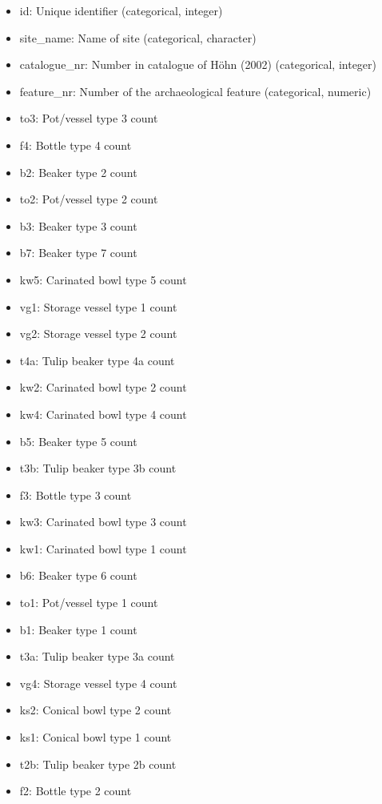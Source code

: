 \documentclass[a3, ruledsections, 8pt]{sciposter}
\begin{document}
\begin{multicols}{3}

\begin{small}

\begin{itemize}
\item id: Unique identifier (categorical, integer)
\item site\_name: Name of site (categorical, character)
\item catalogue\_nr: Number in catalogue of Höhn (2002) (categorical, integer)
\item feature\_nr: Number of the archaeological feature (categorical, numeric)
\item to3: Pot/vessel type 3 count
\item f4: Bottle type 4 count
\item b2: Beaker type 2 count
\item to2: Pot/vessel type 2 count
\item b3: Beaker type 3 count
\item b7: Beaker type 7 count
\item kw5: Carinated bowl type 5 count
\item vg1: Storage vessel type 1 count
\item vg2: Storage vessel type 2 count
\item t4a: Tulip beaker type 4a count
\item kw2: Carinated bowl type 2 count
\item kw4: Carinated bowl type 4 count
\item b5: Beaker type 5 count
\item t3b: Tulip beaker type 3b count
\item f3: Bottle type 3 count
\item kw3: Carinated bowl type 3 count
\item kw1: Carinated bowl type 1 count
\item b6: Beaker type 6 count
\item to1: Pot/vessel type 1 count
\item b1: Beaker type 1 count
\item t3a: Tulip beaker type 3a count
\item vg4: Storage vessel type 4 count
\item ks2: Conical bowl type 2 count
\item ks1: Conical bowl type 1 count
\item t2b: Tulip beaker type 2b count
\item f2: Bottle type 2 count

\end{itemize}
\end{small}
\end{multicols}
\end{document}
